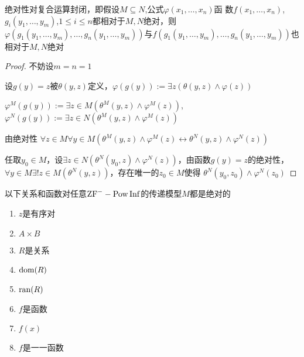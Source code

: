 \documentclass[11pt]{article}
\begin{document}
\begin{lemma}[]
绝对性对复合运算封闭，即假设\(M\subseteq N\),公式\(\varphi(x_1,\dots,x_n)\)函
数\(f(x_1,\dots,x_n)\), \(g_i(y_1,\dots,y_m)\),\(1\le i\le n\)都相对于\(M,N\)绝对，则
\(\varphi(g_1(y_1,\dots,y_m),\dots,g_n(y_1,\dots,y_m))\)与\(f(g_1(y_1,\dots,y_m),\dots,g_n(y_1,\dots,y_m))\)也相对于\(M,N\)绝对
\end{lemma}

\begin{proof}
不妨设\(m=n=1\)

设\(g(y)=z\)被\(\theta(y,z)\)定义，\(\varphi(g(y)):=\exists z(\theta(y,z)\wedge\varphi(z))\)

\(\varphi^M(g(y)):=\exists z\in M(\theta^M(y,z)\wedge\varphi^M(z))\),\(\varphi^N(g(y)):=\exists z\in N(\theta^M(y,z)\wedge\varphi^M(z))\)

由绝对性
\(\forall z\in M\forall y\in M(\theta^M(y,z)\wedge\varphi^M(z)\leftrightarrow\theta^N(y,z)\wedge\varphi^N(z))\)

任取\(y_0\in M\)，设\(\exists z\in N(\theta^N(y_0,z)\wedge\varphi^N(z))\)，由函数\(g(y)=z\)的绝对性，
\(\forall y\in M\exists! z\in M(\theta^N(y,z))\)，存在唯一的\(z_0\in M\)使得
\(\theta^N(y_0,z_0)\wedge\varphi^N(z_0)\)
\end{proof}

\begin{theorem}[]
以下关系和函数对任意\(\text{ZF}^--\operatorname{Pow}\operatorname{Inf}\)的传递模型\(M\)都是绝对的
\begin{enumerate}
\item \(z\)是有序对
\item \(A\times B\)
\item \(R\)是关系
\item \(\operatorname{dom}(R)\)
\item \(\operatorname{ran}(R)\)
\item \(f\)是函数
\item \(f(x)\)
\item \(f\)是一一函数
\end{enumerate}
\end{theorem}
\end{document}
